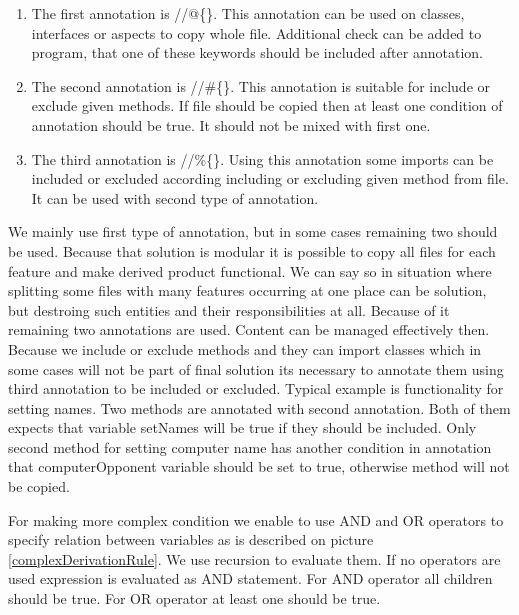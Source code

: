 \documentclass[11pt,slovak,a4paper,twoside]{article}
\begin{document}
\begin{enumerate}
	\item The first annotation is //@\{\}. This annotation can be used on classes, interfaces or aspects to copy whole file. Additional check can be added to program, that one of these keywords should be included after annotation.

	\item The second annotation is //\#\{\}. This annotation is suitable for include or exclude given methods. If file should be copied then at least one condition of annotation should be true. It should not be mixed with first one. 

	\item The third annotation is //\%\{\}. Using this annotation some imports can be included or excluded according including or excluding given method from file. It can be used with second type of annotation. 
\end{enumerate}

We mainly use first type of annotation, but in some cases remaining two should be used. Because that solution is modular it is possible to copy all files for each feature and make derived product functional. We can say so in situation where splitting some files with many features occurring at one place can be solution, but destroing such entities and their responsibilities at all. Because of it remaining two annotations are used. Content can be managed effectively then. Because we include or exclude methods and they can import classes which in some cases will not be part of final solution its necessary to annotate them using third annotation to be included or excluded. Typical example is functionality for setting names. Two methods are annotated with second annotation. Both of them expects that variable setNames will be true if they should be included. Only second method for setting computer name has another condition in annotation that computerOpponent variable should be set to true, otherwise method will not be copied. 
 
For making more complex condition we enable to use AND and OR operators to specify relation between variables as is described on picture \ref{complexDerivationRule}. We use recursion to evaluate them. If no operators are used expression is evaluated as AND statement. For AND operator all children should be true. For OR operator at least one should be true.
\end{document}
